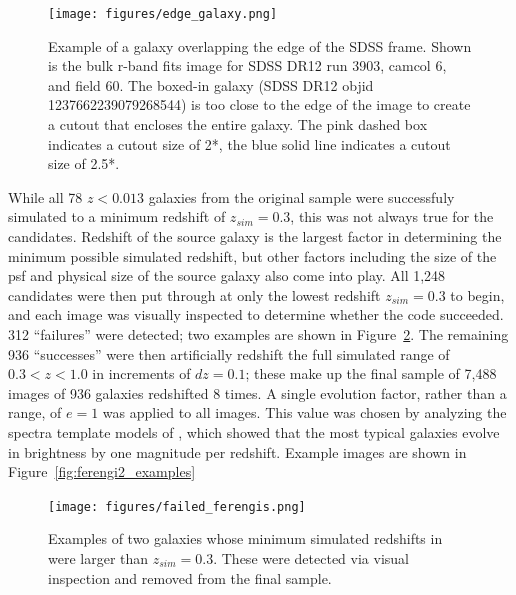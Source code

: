 \begin{figure}
\begin{center}
\texttt{[image: figures/edge\_galaxy.png]}
\caption{Example of a galaxy overlapping the edge of the SDSS frame. Shown is the bulk r-band fits image for SDSS DR12 run 3903, camcol 6, and field 60. The boxed-in galaxy (SDSS DR12 objid 1237662239079268544) is too close to the edge of the image to create a cutout that encloses the entire galaxy. The pink dashed box indicates a cutout size of 2*\radr, the blue solid line indicates a cutout size of 2.5*\radr. } 
\label{fig:edge_galaxy}
\end{center}
\end{figure}

While all 78 $z<0.013$ galaxies from the original \ferengi{} sample were successfuly simulated to a minimum redshift of $z_{sim}=0.3$, this was not always true for the  candidates. Redshift of the source galaxy is the largest factor in determining the minimum possible simulated redshift, but other factors including the size of the psf and physical size of the source galaxy also come into play. All 1,248 candidates were then put through \ferengi{} at only the lowest redshift $z_{sim}=0.3$ to begin, and each image was visually inspected to determine whether the code succeeded. 312 ``failures'' were detected; two examples are shown in Figure~\ref{fig:ferengi_fails}. The remaining 936 ``successes'' were then artificially redshift the full simulated range of $0.3<z<1.0$ in increments of $dz = 0.1$; these make up the final  sample of 7,488 images of 936 galaxies redshifted 8 times. A single evolution factor, rather than a range, of $e=1$ was applied to all images. This value was chosen by analyzing the spectra template models of \cite{Brinchmann2004a}, which showed that the most typical galaxies evolve in brightness by one magnitude per redshift. Example images are shown in Figure~\ref{fig:ferengi2_examples}


\begin{figure}
\begin{center}
\texttt{[image: figures/failed\_ferengis.png]}
\caption{Examples of two galaxies whose minimum simulated redshifts in \ferengi{} were larger than $z_{sim}=0.3$. These were detected via visual inspection and removed from the final  sample.} 
\label{fig:ferengi_fails}
\end{center}
\end{figure}


